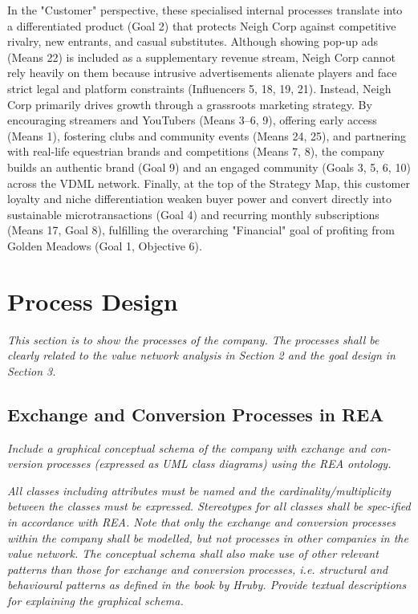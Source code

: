 \documentclass{article}
\begin{document}
In the "Customer" perspective, these specialised internal processes translate into a differentiated product (Goal 2) that protects Neigh Corp against competitive rivalry, new entrants, and casual substitutes. Although showing pop-up ads (Means 22) is included as a supplementary revenue stream, Neigh Corp cannot rely heavily on them because intrusive advertisements alienate players and face strict legal and platform constraints (Influencers 5, 18, 19, 21). Instead, Neigh Corp primarily drives growth through a grassroots marketing strategy. By encouraging streamers and YouTubers (Means 3--6, 9), offering early access (Means 1), fostering clubs and community events (Means 24, 25), and partnering with real-life equestrian brands and competitions (Means 7, 8), the company builds an authentic brand (Goal 9) and an engaged community (Goals 3, 5, 6, 10) across the VDML network. Finally, at the top of the Strategy Map, this customer loyalty and niche differentiation weaken buyer power and convert directly into sustainable microtransactions (Goal 4) and recurring monthly subscriptions (Means 17, Goal 8), fulfilling the overarching "Financial" goal of profiting from Golden Meadows (Goal 1, Objective 6).


\section{Process Design}
\textit{
This section is to show the processes of the company. The processes shall be clearly related to the value network analysis in Section 2 and the goal design in Section 3.
}

\subsection{Exchange and Conversion Processes in REA}
\textit{
Include a graphical conceptual schema of the company with exchange and con- version processes (expressed as UML class diagrams) using the REA ontology.
}

\textit{
All classes including attributes must be named and the cardinality/multiplicity between the classes must be expressed. Stereotypes for all classes shall be spec-ified in accordance with REA. Note that only the exchange and conversion processes within the company shall be modelled, but not processes in other companies in the value network. The conceptual schema shall also make use of other relevant patterns than those for exchange and conversion processes, i.e. structural and behavioural patterns as defined in the book by Hruby. Provide textual descriptions for explaining the graphical schema.
}
\end{document}
